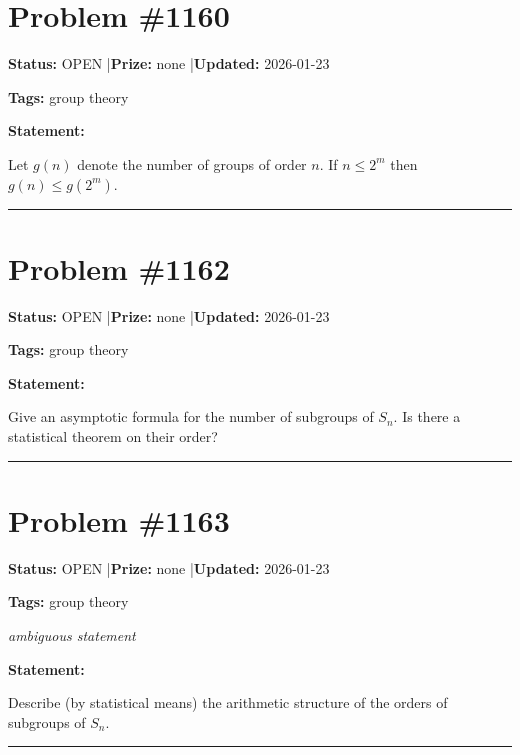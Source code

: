 \documentclass{article}
\begin{document}
\section{Problem \#1160}
\label{prob:1160}

\noindent\textbf{Status:} OPEN \quad|\quad \textbf{Prize:} none \quad|\quad \textbf{Updated:} 2026-01-23

\noindent\textbf{Tags:} group theory

\medskip

\noindent\textbf{Statement:}

Let $g(n)$ denote the number of groups of order $n$. If $n\leq 2^m$ then $g(n)\leq g(2^m)$.

\noindent\rule{\linewidth}{0.4pt}


\section{Problem \#1162}
\label{prob:1162}

\noindent\textbf{Status:} OPEN \quad|\quad \textbf{Prize:} none \quad|\quad \textbf{Updated:} 2026-01-23

\noindent\textbf{Tags:} group theory

\medskip

\noindent\textbf{Statement:}

Give an asymptotic formula for the number of subgroups of $S_n$. Is there a statistical theorem on their order?

\noindent\rule{\linewidth}{0.4pt}


\section{Problem \#1163}
\label{prob:1163}

\noindent\textbf{Status:} OPEN \quad|\quad \textbf{Prize:} none \quad|\quad \textbf{Updated:} 2026-01-23

\noindent\textbf{Tags:} group theory

\medskip
\noindent\textit{ambiguous statement}


\noindent\textbf{Statement:}

Describe (by statistical means) the arithmetic structure of the orders of subgroups of $S_n$.

\noindent\rule{\linewidth}{0.4pt}


\end{document}
